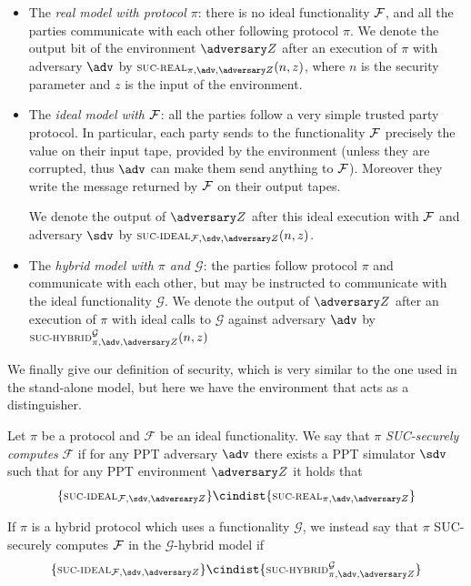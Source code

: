 \begin{itemize}
    \item The \emph{real model with protocol $\pi$}: there is no ideal functionality $\mathcal{F}$, and all the parties communicate with each other following protocol $\pi$. We denote the output bit of the environment $\zdv$ after an execution of $\pi$ with adversary $\adv$ by $\textsc{\scriptsize SUC-REAL}_{\pi,\adv,\zdv}(n,z)$, where $n$ is the security parameter and $z$ is the input of the environment.
    \item The \emph{ideal model with $\mathcal{F}$}: all the parties follow a very simple trusted party protocol. In particular, each party sends to the functionality $\mathcal{F}$ precisely the value on their input tape, provided by the environment (unless they are corrupted, thus $\adv$ can make them send anything to $\mathcal{F}$). Moreover they write the message returned by $\mathcal{F}$ on their output tapes.
    
    We denote the output of $\zdv$ after this ideal execution with $\mathcal{F}$ and adversary $\sdv$ by $\textsc{\scriptsize SUC-IDEAL}_{\Fun,\sdv,\zdv}(n,z)$.
    
    \item The \emph{hybrid model with $\pi$ and $\mathcal G$}: the parties follow protocol $\pi$ and communicate with each other, but may be instructed to communicate with the ideal functionality $\mathcal G$. We denote the output of $\zdv$ after an execution of $\pi$ with ideal calls to $\mathcal G$ against adversary $\adv$ by $\textsc{\scriptsize SUC-HYBRID}^{\mathcal G}_{\pi,\adv,\zdv}(n,z)$
\end{itemize}

We finally give our definition of security, which is very similar to the one used in the stand-alone model, but here we have the environment that acts as a distinguisher.

\begin{definition}
    Let $\pi$ be a protocol and $\mathcal F$ be an ideal functionality. We say that $\pi$ \emph{SUC-securely computes} $\mathcal F$ if for any PPT adversary $\adv$ there exists a PPT simulator $\sdv$ such that for any PPT environment $\zdv$ it holds that
    $$ \{ \textsc{\scriptsize SUC-IDEAL}_{\Fun, \sdv, \zdv} \} \cindist \{ \textsc{\scriptsize SUC-REAL}_{\pi, \adv, \zdv} \}$$
    
    If $\pi$ is a hybrid protocol which uses a functionality $\mathcal G$, we instead say that $\pi$ SUC-securely computes $\mathcal{F}$ in the $\mathcal G$-hybrid model if
    $$ \{ \textsc{\scriptsize SUC-IDEAL}_{\Fun, \sdv, \zdv} \} \cindist \{ \textsc{\scriptsize SUC-HYBRID}^{\mathcal G}_{\pi, \adv, \zdv} \}$$
\end{definition}

